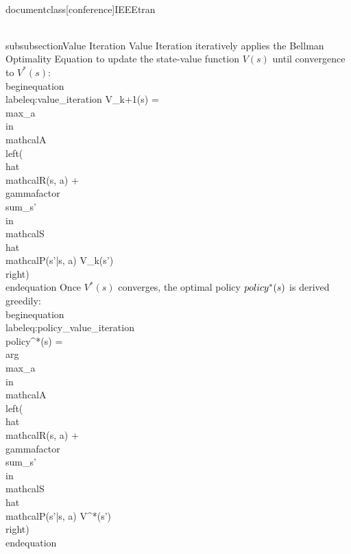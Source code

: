 \\documentclass[conference]{IEEEtran}
\begin{document}
\\subsubsection{Value Iteration}
Value Iteration iteratively applies the Bellman Optimality Equation to update the state-value function $V(s)$ until convergence to $V^*(s)$:
\\begin{equation}
\\label{eq:value_iteration}
V_{k+1}(s) = \\max_{a \\in \\mathcal{A}} \\left( \\hat{\\mathcal{R}}(s, a) + \\gammafactor \\sum_{s' \\in \\mathcal{S}} \\hat{\\mathcal{P}}(s'|s, a) V_k(s') \\right)
\\end{equation}
Once $V^*(s)$ converges, the optimal policy $\\policy^*(s)$ is derived greedily:
\\begin{equation}
\\label{eq:policy_value_iteration}
\\policy^*(s) = \\arg\\max_{a \\in \\mathcal{A}} \\left( \\hat{\\mathcal{R}}(s, a) + \\gammafactor \\sum_{s' \\in \\mathcal{S}} \\hat{\\mathcal{P}}(s'|s, a) V^*(s') \\right)
\\end{equation}
\end{document}
